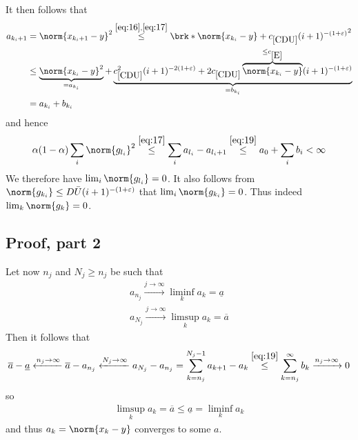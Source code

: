 \begin{frame}
	\begin{proofs}
	It then follows that
	\begin{equation}
	\begin{aligned}
		a_{{k_i}+1} &= \norm{x_{{k_i}+1}-y}^2\stackrel{\eqref{eq:16}, \eqref{eq:17}}{\leq}\brk*{\norm{x_{k_i}-y}+\useconstant{CDU}(i+1)^{-(1+\e)}}^2 \\
		&\leq \underbrace{\norm{x_{k_i}-y}^2}_{=a_{k_i}}+\underbrace{\useconstant{CDU}^2(i+1)^{-2(1+\e)}+2\useconstant{CDU}\overbrace{\norm{x_{k_i}-y}}^{\leq \useconstant{E}}(i+1)^{-(1+\e)}}_{=b_{k_i}} \\
		&= a_{k_i}+b_{k_i}
	\end{aligned}
	\label{eq:19}
	\end{equation}
	and hence
	\begin{align*}
		\alpha(1-\alpha)\sum_i\norm{g_{l_i}}^2
		\stackrel{\eqref{eq:17}}{\leq} \sum_i a_{l_i}-a_{l_i+1}
		\stackrel{\eqref{eq:19}}{\leq}a_0+\sum_i b_i
		<\infty
	\end{align*}
	We therefore have $\lim_i\norm{g_{l_i}}=0$. It also follows from $\norm{g_{k_i}}\leq D\barU (i+1)^{-(1+\e)}$ that $\lim_i\norm{g_{k_i}}=0$. Thus indeed $\lim_k\norm{g_k}=0$.
	\end{proofs}
\end{frame}

\subsection{Proof, part 2}
\begin{frame}
	\begin{proofs}
	Let now $n_j$ and  $N_j\geq n_j$ be such that
	\begin{align*}
		a_{n_j}\xrightarrow{j\to\infty}\liminf_ka_k=\underline{a} \\
		a_{N_j}\xrightarrow{j\to\infty}\limsup_ka_k=\overline{a}	
	\end{align*}
	Then it follows that
	\begin{align*}
		\overline{a}-\underline{a}
		\xleftarrow{n_j\to\infty}\overline{a}-a_{n_j}
		\xleftarrow{N_j\to\infty}a_{N_j}-a_{n_j}
		= \sum_{k=n_j}^{N_j-1}a_{k+1}-a_k
		\stackrel{\eqref{eq:19}}{\leq} \sum_{k=n_j}^\infty b_k
		\xrightarrow{n_j\to\infty}0
	\end{align*}
	so
	\begin{align*}
		\limsup_ka_k=\overline{a}\leq \underline{a}=\liminf_ka_k
	\end{align*}
	and thus $a_k=\norm{x_k-y}$ converges to some $a$.
	\end{proofs}
\end{frame}

